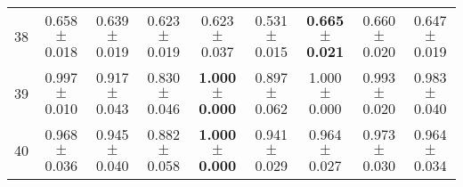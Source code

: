 \begin{table}[!ht]
{\begin{tabular}{r c c c c c c c c}
38 & 0.658 $\pm$ 0.018 & 0.639 $\pm$ 0.019 & 0.623 $\pm$ 0.019 & 0.623 $\pm$ 0.037 & 0.531 $\pm$ 0.015 & \textbf{0.665 $\pm$ 0.021} & 0.660 $\pm$ 0.020 & 0.647 $\pm$ 0.019 \\
39 & 0.997 $\pm$ 0.010 & 0.917 $\pm$ 0.043 & 0.830 $\pm$ 0.046 & \textbf{1.000 $\pm$ 0.000} & 0.897 $\pm$ 0.062 & 1.000 $\pm$ 0.000 & 0.993 $\pm$ 0.020 & 0.983 $\pm$ 0.040 \\
40 & 0.968 $\pm$ 0.036 & 0.945 $\pm$ 0.040 & 0.882 $\pm$ 0.058 & \textbf{1.000 $\pm$ 0.000} & 0.941 $\pm$ 0.029 & 0.964 $\pm$ 0.027 & 0.973 $\pm$ 0.030 & 0.964 $\pm$ 0.034 \\
\end{tabular}}
\end{table}
